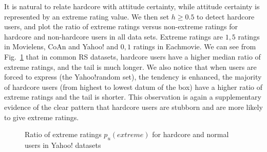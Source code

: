 \documentclass[sigconf]{acmart}
\begin{document}
It is natural to relate hardcore with attitude certainty, while attitude certainty is represented by an extreme rating value. We then set $h\geq 0.5$ to detect hardcore users, and plot the ratio of extreme ratings versus non-extreme ratings for hardcore and non-hardcore users in all data sets. Extreme ratings are $1,5$ ratings in Movielens, CoAn and Yahoo! and $0,1$ ratings in Eachmovie. We can see from Fig.~\ref{fig:hardcore} that in common RS datasets, hardcore users have a higher median ratio of extreme ratings, and the tail is much longer. We also notice that when users are forced to express (the Yahoo!random set), the tendency is enhanced, the majority of hardcore users (from highest to lowest datum of the box) have a higher ratio of extreme ratings and the tail is shorter.  This observation is again a supplementary evidence of the clear pattern that hardcore users are stubborn and are more likely to give extreme ratings.

\begin{figure}[htbp]
\centering
\noindent
{}
\hspace{-0.5cm}
\hspace{-0.5cm}
\hspace{-0.5cm}
\hspace{-0.5cm}
\caption{Ratio of extreme ratings $p_u(extreme)$ for hardcore and normal users in Yahoo! datasets}
\label{fig:hardcore}
\end{figure}
\end{document}
